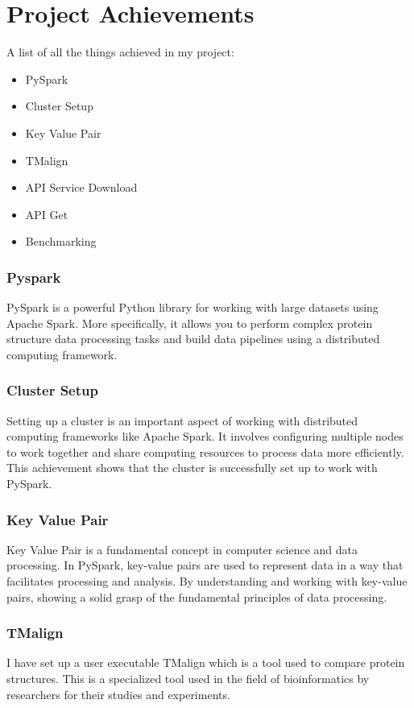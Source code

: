 \documentclass[]{final_report}
\begin{document}
\section{Project Achievements}
A list of all the things achieved in my project:

\begin{itemize}
    \item PySpark
    \item Cluster Setup
    \item Key Value Pair
    \item TMalign
    \item API Service Download
    \item API Get
    \item Benchmarking
\end{itemize}

\subsubsection{Pyspark}
PySpark is a powerful Python library for working with large datasets using Apache Spark. More specifically, it allows you to perform complex protein structure data processing tasks and build data pipelines using a distributed computing framework.

\subsubsection{Cluster Setup}
Setting up a cluster is an important aspect of working with distributed computing frameworks like Apache Spark. It involves configuring multiple nodes to work together and share computing resources to process data more efficiently. This achievement shows that the cluster is successfully set up to work with PySpark.

\subsubsection{Key Value Pair}
Key Value Pair is a fundamental concept in computer science and data processing. In PySpark, key-value pairs are used to represent data in a way that facilitates processing and analysis. By understanding and working with key-value pairs, showing a solid grasp of the fundamental principles of data processing.

\clearpage

\subsubsection{TMalign}
I have set up a user executable TMalign which is a tool used to compare protein structures. This is a specialized tool used in the field of bioinformatics by researchers for their studies and experiments.
\end{document}
